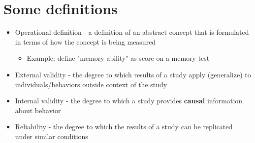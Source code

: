 \documentclass[11pt]{article}
\begin{document}
\section*{Some definitions}
\label{sec-2}
\begin{itemize}
\item Operational definition - a definition of an abstract concept that is formulated in terms of how the concept is being measured
\begin{itemize}
\item Example: define "memory ability" as score on a memory test
\end{itemize}
\item External validity - the degree to which results of a study apply (generalize) to individuals/behaviors outside context of the study
\item Internal validity - the degree to which a study provides \textbf{causal} information about behavior
\item Reliability - the degree to which the results of a study can be replicated under similar conditions
\end{itemize}
\end{document}
